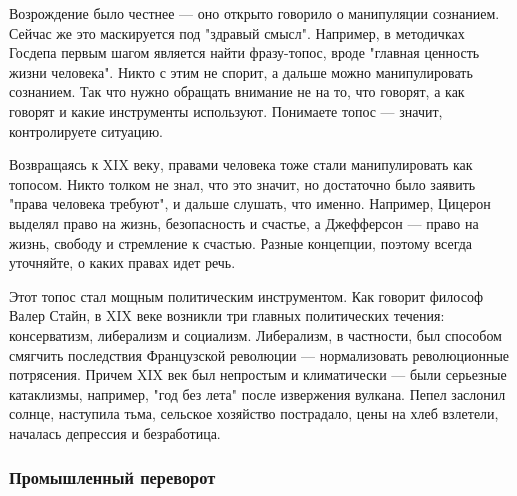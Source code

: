 Возрождение было честнее --- оно открыто говорило о манипуляции сознанием. Сейчас же это маскируется под "здравый смысл". Например, в методичках Госдепа первым шагом является найти фразу-топос, вроде "главная ценность жизни человека". Никто с этим не спорит, а дальше можно манипулировать сознанием. Так что нужно обращать внимание не на то, что говорят, а как говорят и какие инструменты используют. Понимаете топос --- значит, контролируете ситуацию.

Возвращаясь к XIX веку, правами человека тоже стали манипулировать как топосом. Никто толком не знал, что это значит, но достаточно было заявить "права человека требуют", и дальше слушать, что именно. Например, Цицерон выделял право на жизнь, безопасность и счастье, а Джефферсон --- право на жизнь, свободу и стремление к счастью. Разные концепции, поэтому всегда уточняйте, о каких правах идет речь.

Этот топос стал мощным политическим инструментом. Как говорит философ Валер Стайн, в XIX веке возникли три главных политических течения: консерватизм, либерализм и социализм. Либерализм, в частности, был способом смягчить последствия Французской революции --- нормализовать революционные потрясения. Причем XIX век был непростым и климатически --- были серьезные катаклизмы, например, "год без лета" после извержения вулкана. Пепел заслонил солнце, наступила тьма, сельское хозяйство пострадало, цены на хлеб взлетели, началась депрессия и безработица.

\subsubsection{Промышленный переворот}


